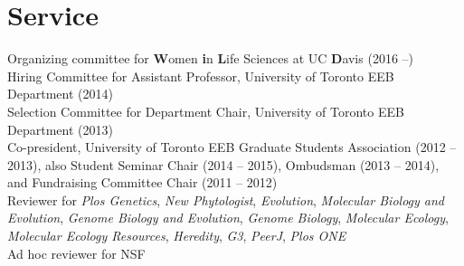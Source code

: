 \documentclass[letterpaper]{article}
\begin{document}
\section*{Service}
Organizing committee for \textbf{W}omen \textbf{i}n \textbf{L}ife Sciences at UC \textbf{D}avis (2016 --) \\ [.5ex]
Hiring Committee for Assistant Professor, University of Toronto EEB Department (2014) \\ [.5ex]
Selection Committee for Department Chair, University of Toronto EEB Department (2013) \\ [.5ex]
Co-president, University of Toronto EEB Graduate Students Association (2012 -- 2013), also Student Seminar Chair (2014 -- 2015), Ombudsman (2013 -- 2014), and Fundraising Committee Chair (2011 -- 2012)\\ [.5ex]
Reviewer for \textit{Plos Genetics}, \textit{New Phytologist}, \textit{Evolution}, \textit{Molecular Biology and Evolution}, \textit{Genome Biology and Evolution}, \textit{Genome Biology}, \textit{Molecular Ecology}, \textit{Molecular Ecology Resources}, \textit{Heredity}, \textit{G3}, \textit{PeerJ}, \textit{Plos ONE}\\
Ad hoc reviewer for NSF
%
\end{document}
